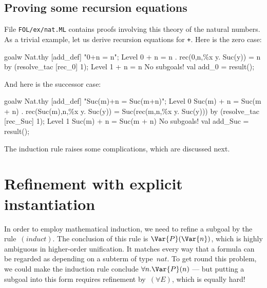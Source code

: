 \subsection{Proving some recursion equations}
File {\tt FOL/ex/nat.ML} contains proofs involving this theory of the
natural numbers.  As a trivial example, let us derive recursion equations
for \verb$+$.  Here is the zero case:
\begin{ttbox}
goalw Nat.thy [add_def] "0+n = n";
{\out Level 0}
{ + n = n}
{. rec(0,n,\%x y. Suc(y)) = n}
\ttbreak
by (resolve_tac [rec_0] 1);
{\out Level 1}
{ + n = n}
{\out No subgoals!}
val add_0 = result();
\end{ttbox}
And here is the successor case:
\begin{ttbox}
goalw Nat.thy [add_def] "Suc(m)+n = Suc(m+n)";
{\out Level 0}
{\out Suc(m) + n = Suc(m + n)}
{. rec(Suc(m),n,\%x y. Suc(y)) = Suc(rec(m,n,\%x y. Suc(y)))}
\ttbreak
by (resolve_tac [rec_Suc] 1);
{\out Level 1}
{\out Suc(m) + n = Suc(m + n)}
{\out No subgoals!}
val add_Suc = result();
\end{ttbox}
The induction rule raises some complications, which are discussed next.


\section{Refinement with explicit instantiation}

In order to employ mathematical induction, we need to refine a subgoal by
the rule~$(induct)$.  The conclusion of this rule is $\Var{P}(\Var{n})$,
which is highly ambiguous in higher-order unification.  It matches every
way that a formula can be regarded as depending on a subterm of type~$nat$.
To get round this problem, we could make the induction rule conclude
$\forall n.\Var{P}(n)$ --- but putting a subgoal into this form requires
refinement by~$(\forall E)$, which is equally hard!

